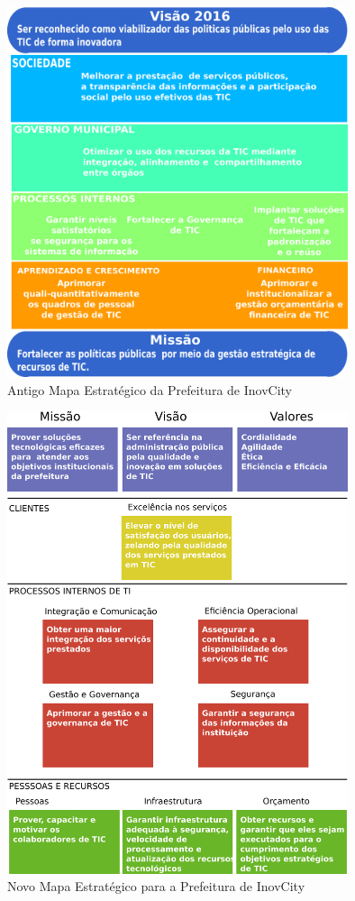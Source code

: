 \documentclass[        
    a4paper,          %
    12pt,             %
    chapter=TITLE,    %
    section=Title,    %
    subsection=Title, %
    oneside,          %
    english,          %
    spanish,          %
    brazil,           %
    sumario=abnt-6027-2012,
]{abntex2}
\newcommand{\EMPRESA}{Prefeitura de InovCity}
\begin{document}
\begin{figure}[H]
    \centering
    \caption{Antigo Mapa Estratégico da \EMPRESA{}}\label{mapa_estrategico_2016}
    \includegraphics[width=10cm]{figuras/mapa_estrategico_2016.png}
\end{figure}

\begin{figure}[H]
    \centering
    \caption{Novo Mapa Estratégico para a \EMPRESA{}}\label{mapa_estrategico_2017_19}
    \includegraphics[width=10cm]{figuras/mapa_estrategico_2017_19.png}
\end{figure}
\end{document}
